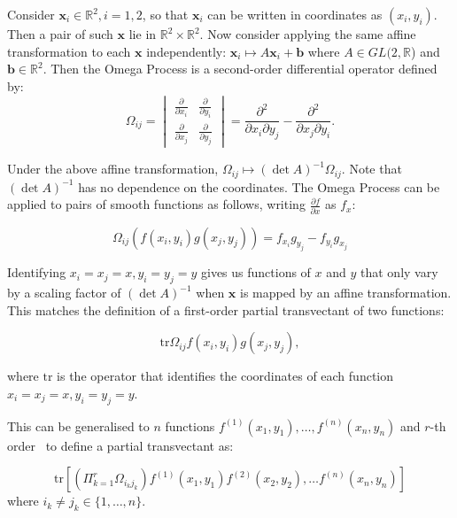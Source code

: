 \documentclass[review,onefignum,onetabnum]{siamonline190516}
\begin{document}
Consider $\mathbf{x}_i \in \mathbb{R}^2, i=1,2$, so that $\mathbf{x}_i$ can
be written in coordinates as $(x_i, y_i)$. Then a pair of such $\mathbf{x}$ lie in $\mathbb{R}^2 \times \mathbb{R}^2$. Now consider applying the same affine transformation to each $\mathbf{x}$ independently: $\mathbf{x}_i \mapsto A \mathbf{x}_i + \mathbf{b}$ where $A \in GL(2,\mathbb{R}$) and $\mathbf{b} \in \mathbb{R}^2$. Then the Omega Process is a second-order differential operator defined by: 
\begin{equation}
\Omega_{ij} = \begin{vmatrix} \frac{\partial}{\partial x_i} &
\frac{\partial}{\partial y_i} \\ \frac{\partial}{\partial x_j} &
\frac{\partial}{\partial y_j} \end{vmatrix} = 
\frac{\partial^2}{\partial x_i
\partial y_j} - \frac{\partial^2}{\partial x_j \partial y_i}.
\end{equation}

Under the above affine transformation, $\Omega_{ij} \mapsto (\det A)^{-1}
\Omega_{ij}$. Note that $(\det A)^{-1}$ has no dependence on the coordinates.
The Omega Process can be applied to pairs of smooth functions as follows,
writing $\frac{\partial f}{\partial x}$ as $f_x$:

\begin{equation}
\Omega_{ij} \left(f(x_i, y_i) g(x_j, y_j)\right) = f_{x_i}g_{y_j} - f_{y_i}g_{x_j}
\end{equation}

Identifying $x_i = x_j = x, y_i = y_j = y$ gives us functions of $x$ and $y$
that only vary by a scaling factor of $(\det A)^{-1}$ when $\mathbf{x}$ is
mapped by an affine transformation. This matches the definition of a
first-order partial transvectant of two functions:

\begin{equation}
\mbox{tr} \Omega_{ij} f(x_i, y_i) g(x_j, y_j),
\end{equation}

\noindent where $\mbox{tr}$  is the operator that identifies the coordinates of each function $x_i = x_j = x, y_i = y_j = y$.

This can be generalised to $n$ functions $f^{(1)}(x_1, y_1), \ldots, f^{(n)}(x_n, y_n)$ and $r$-th order~\cite{Olver} to define a partial transvectant as:

\begin{equation}
\mbox{tr} \left[\left( \Pi_{k=1}^r \Omega_{i_k j_k} \right) f^{(1)}(x_1, y_1)
f^{(2)}(x_2, y_2), \ldots f^{(n)} (x_n, y_n)\right]
\end{equation}
where $i_k \neq j_k \in \{1, \ldots, n\}$.
\end{document}
